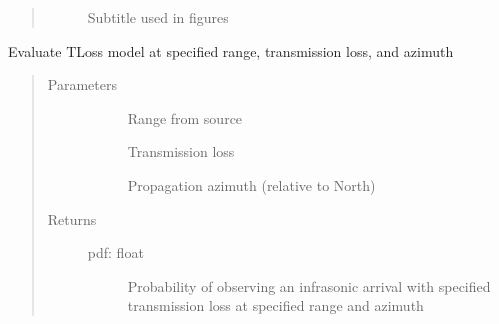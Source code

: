 \documentclass[letterpaper,10pt,english]{sphinxmanual}
\begin{document}
\begin{fulllineitems}
\begin{fulllineitems}
\begin{quote}
\begin{description}
\begin{description}
\item[{}] \leavevmode
Subtitle used in figures

\end{description}

\end{description}\end{quote}

\end{fulllineitems}


\begin{fulllineitems}
\label{\detokenize{stochprop.propagation:stochprop.propagation.TLossModel.eval}}
Evaluate TLoss model at specified range, transmission loss, and azimuth
\begin{quote}\begin{description}
\item[{Parameters}] \leavevmode\begin{description}
\item[{}] \leavevmode
Range from source

\item[{}] \leavevmode
Transmission loss

\item[{}] \leavevmode
Propagation azimuth (relative to North)

\end{description}

\item[{Returns}] \leavevmode\begin{description}
\item[{pdf: float}] \leavevmode
Probability of observing an infrasonic arrival with specified transmission loss at specified range and azimuth

\end{description}

\end{description}\end{quote}

\end{fulllineitems}



\end{fulllineitems}
\end{document}
